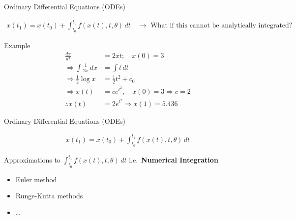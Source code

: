 \documentclass[aspectratio=169,xcolor=dvipsnames,svgnames,x11names,fleqn]{beamer}
\begin{document}
\begin{frame}{Ordinary Differential Equations (ODEs)}

\scriptsize

  \begin{align*}
    x(t_1) = x(t_0) + \boxed{\int_{t_0}^{t_1} f(x(t), t, \theta)\, dt}
    \quad \longrightarrow \text{ What if this cannot be analytically integrated?}
  \end{align*}
 
  \begin{block}{Example}
    \begin{align*}
      \frac{dx}{dt} &= 2xt;\quad x(0) = 3\\
      \Rightarrow \int \frac{1}{2x}\, dx &= \int t\, dt\\
      \Rightarrow \tfrac{1}{2}\log x &= \tfrac{1}{2}t^2 + c_0\\
      \Rightarrow x(t) &= ce^{t^2},\quad x(0) = 3 \Rightarrow c = 2\\
      \therefore x(t) &= 2e^{t^2} \Rightarrow x(1) = 5.436
    \end{align*}
  \end{block}
\end{frame}
 
 
 \begin{frame}{Ordinary Differential Equations (ODEs)}


  \begin{align*}
    x(t_1) = x(t_0) + \int_{t_0}^{t_1} f(x(t), t, \theta)\, dt
  \end{align*}
 
  \begin{block}{Approximations to $\int_{t_0}^{t_1} f(x(t),t,\theta)\,dt$\;  i.e.\ \textbf{Numerical Integration}}
    \begin{itemize}
      \item Euler method
      \item Runge-Kutta methods
      \item \ldots
    \end{itemize}
  \end{block}
\end{frame}
\end{document}
